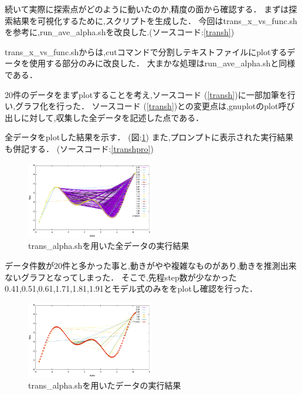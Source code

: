 続いて実際に探索点がどのように動いたのか,精度の面から確認する．
まずは探索結果を可視化するために,スクリプトを生成した．
今回はtrans\_x\_vs\_func.shを参考に,run\_ave\_alpha.shを改良した.(ソースコード:\ref{transh})


trans\_x\_vs\_func.shからは,cutコマンドで分割しテキストファイルにplotするデータを使用する部分のみに改良した．
大まかな処理はrun\_ave\_alpha.shと同様である．

20件のデータをまずplotすることを考え,ソースコード (\ref{transh})に一部加筆を行い,グラフ化を行った．
ソースコード (\ref{transh})との変更点は,gnuplotのplot呼び出しに対して,収集した全データを記述した点である．

全データをplotした結果を示す． (図:\ref{fig:alottrance})
また,プロンプトに表示された実行結果も併記する． (ソースコード:\ref{transhpro})


\begin{figure}[H]
    \centering
    \includegraphics[width=0.5\textwidth]{figs/level2.3/alpha_ave_trans_alot.pdf}
    \caption{trans\_alpha.shを用いた全データの実行結果}
\label{fig:alottrance}
\end{figure}

データ件数が20件と多かった事と,動きがやや複雑なものがあり,動きを推測出来ないグラフとなってしまった．
そこで,先程step数が少なかった0.41,0.51,0.61,1.71,1.81,1.91とモデル式のみををplotし確認を行った．
\begin{figure}[H]
    \centering
    \includegraphics[width=0.5\textwidth]{figs/level2.3/alpha_ave_trans.pdf}
\caption{trans\_alpha.shを用いたデータの実行結果}
\label{fig:pickttrance}
\end{figure}

